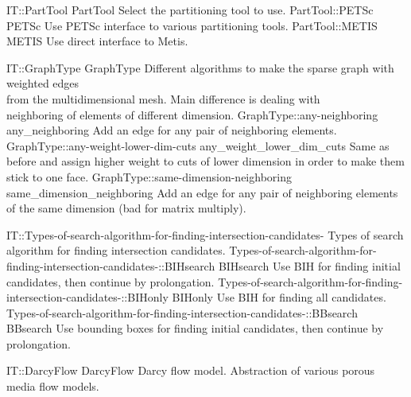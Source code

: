 \begin{SelectionType}
	{IT::PartTool}
	{PartTool}
	{{{Select the partitioning tool to use.}%
}}
		\SelectionItem
			{PartTool::PETSc}
			{PETSc}
			{{{Use PETSc interface to various partitioning tools.}%
}}
		\SelectionItem
			{PartTool::METIS}
			{METIS}
			{{{Use direct interface to Metis.}%
}}
\end{SelectionType}
\begin{SelectionType}
	{IT::GraphType}
	{GraphType}
	{{{Different algorithms to make the sparse graph with weighted edges}\\{
from the multidimensional mesh.
Main difference is dealing with }\\{
neighboring of elements of different dimension.}%
}}
		\SelectionItem
			{GraphType::any-neighboring}
			{any{\_}neighboring}
			{{{Add an edge for any pair of neighboring elements.}%
}}
		\SelectionItem
			{GraphType::any-weight-lower-dim-cuts}
			{any{\_}weight{\_}lower{\_}dim{\_}cuts}
			{{{Same as before and assign higher weight to cuts of lower dimension in order to make them stick to one face.}%
}}
		\SelectionItem
			{GraphType::same-dimension-neighboring}
			{same{\_}dimension{\_}neighboring}
			{{{Add an edge for any pair of neighboring elements of the same dimension (bad for matrix multiply).}%
}}
\end{SelectionType}
\begin{SelectionType}
	{IT::Types-of-search-algorithm-for-finding-intersection-candidates-}
	{Types of search algorithm for finding intersection candidates.}
	{}
		\SelectionItem
			{Types-of-search-algorithm-for-finding-intersection-candidates-::BIHsearch}
			{BIHsearch}
			{{{Use BIH for finding initial candidates, then continue by prolongation.}%
}}
		\SelectionItem
			{Types-of-search-algorithm-for-finding-intersection-candidates-::BIHonly}
			{BIHonly}
			{{{Use BIH for finding all candidates.}%
}}
		\SelectionItem
			{Types-of-search-algorithm-for-finding-intersection-candidates-::BBsearch}
			{BBsearch}
			{{{Use bounding boxes for finding initial candidates, then continue by prolongation.}%
}}
\end{SelectionType}
\begin{AbstractType}
	{IT::DarcyFlow}
	{DarcyFlow}
	{}
	{{{Darcy flow model.
Abstraction of various porous media flow models.}%
}}
\end{AbstractType}
